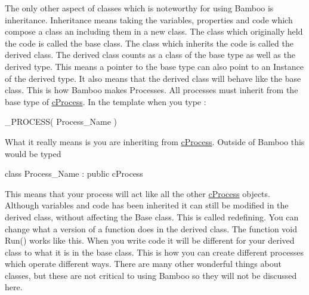 The only other aspect of classes which is noteworthy for using Bamboo is inheritance. Inheritance means taking the variables, properties and code which compose a class an including them in a new class. The class which originally held the code is called the base class. The class which inherits the code is called the derived class. The derived class counts as a class of the base type as well as the derived type. This means a pointer to the base type can also point to an Instance of the derived type. It also means that the derived class will behave like the base class. This is how Bamboo makes Processes. All processes must inherit from the base type of \hyperlink{classc_process}{cProcess}. In the template when you type : 
\begin{DoxyCode}
 _PROCESS( Process_Name )
\end{DoxyCode}
 What it really means is you are inheriting from \hyperlink{classc_process}{cProcess}. Outside of Bamboo this would be typed 
\begin{DoxyCode}
 class Process_Name : public cProcess
\end{DoxyCode}
 This means that your process will act like all the other \hyperlink{classc_process}{cProcess} objects. Although variables and code has been inherited it can still be modified in the derived class, without affecting the Base class. This is called redefining. You can change what a version of a function does in the derived class. The function void Run() works like this. When you write code it will be different for your derived class to what it is in the base class. This is how you can create different processes which operate different ways. There are many other wonderful things about classes, but these are not critical to using Bamboo so they will not be discussed here. 